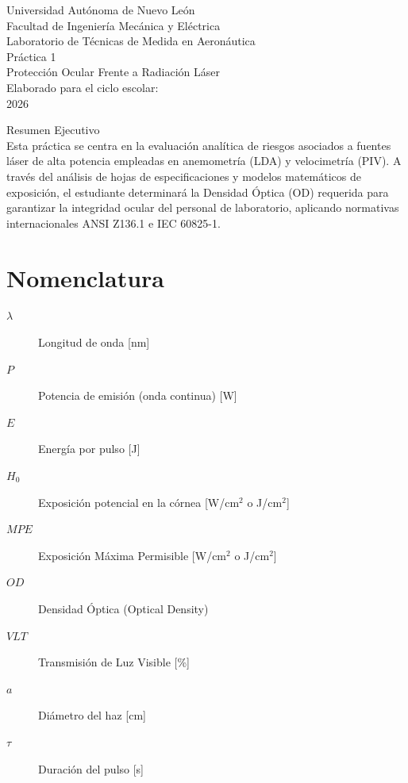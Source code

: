 \documentclass[11pt, a4paper]{article}
\begin{document}
\begin{titlepage}
	\centering
	{\LARGE Universidad Autónoma de Nuevo León}\\[0.5cm]
	{\Large Facultad de Ingeniería Mecánica y Eléctrica}\\[2cm]

	{\Large Laboratorio de Técnicas de Medida en Aeronáutica}\\[1cm]

	{\Huge Práctica 1}\\[0.5cm]
	{\Large Protección Ocular Frente a Radiación Láser}\\[2cm]

	Elaborado para el ciclo escolar:\\
	2026\\[2cm]

	\vfill

	Resumen Ejecutivo\\
	Esta práctica se centra en la evaluación analítica de riesgos asociados a fuentes láser de alta potencia empleadas en anemometría (LDA) y velocimetría (PIV). A través del análisis de hojas de especificaciones y modelos matemáticos de exposición, el estudiante determinará la Densidad Óptica (OD) requerida para garantizar la integridad ocular del personal de laboratorio, aplicando normativas internacionales ANSI Z136.1 e IEC 60825-1.
\end{titlepage}

\tableofcontents
\newpage

\section*{Nomenclatura}
\begin{description}
	\item[$\lambda$] Longitud de onda [nm]
	\item[$P$] Potencia de emisión (onda continua) [W]
	\item[$E$] Energía por pulso [J]
	\item[$H_0$] Exposición potencial en la córnea [W/cm$^2$ o J/cm$^2$]
	\item[$MPE$] Exposición Máxima Permisible [W/cm$^2$ o J/cm$^2$]
	\item[$OD$] Densidad Óptica (Optical Density)
	\item[$VLT$] Transmisión de Luz Visible [\%]
	\item[$a$] Diámetro del haz [cm]
	\item[$\tau$] Duración del pulso [s]
\end{description}
\end{document}
